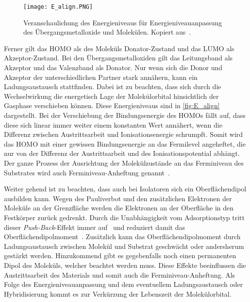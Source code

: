             \begin{figure}
                \centering
                \texttt{[image: E\_align.PNG]}
                \caption{Veranschaulichung des Energieniveaus für Energieniveauanpassung des Übergangsmetalloxide und Molekülen. Kopiert aus~\cite{IF_3}.}
                \label{fig:E_align}
            \end{figure}
            Ferner gilt das HOMO als des Moleküls Donator-Zustand und das LUMO als Akzeptor-Zustand.
            Bei den Übergangsmetalloxiden gilt das Leitungsband als Akzeptor und das Valenzband als Donator. 
            Nur wenn sich die Donor und Akzeptor der unterschiedlichen Partner stark annähern, kann ein Ladungsaustausch stattfinden.
            Dabei ist zu beachten, dass sich durch die Wechselwirkung die energetisch Lage der Molekülorbital hinsichtlich der Gasphase verschieben können.
            Diese Energieniveaus sind in \autoref{fig:E_align} dargestellt.
            Bei der Verschiebung der Bindungsenergie des HOMOs fällt auf, dass diese sich linear immer weiter einem konstanten Wert annähert, wenn die Differenz zwischen Austrittsarbeit und Ionisationsenergie schrumpft.
            Somit wird das HOMO mit einer gewissen Bindungsenergie an das Fermilevel angeheftet, die nur von der Differenz der Austrittsarbeit und des Ionisationspotential abhängt.
            Der ganze Prozess der Ausrichtung der Molekülzustände an das Ferminiveau des Substrates wird auch Ferminiveau-Anheftung genannt~\cite{IF_3}.

            Weiter gehend ist zu beachten, dass auch bei Isolatoren sich ein Oberflächendipol ausbilden kann.
            Wegen des Pauliverbot und den zusätzlichen Elektronen der Moleküle an der Grenzfläche werden die Elektronen an der Oberfläche in den Festkörper zurück gedrenkt.
            Durch die Unabhängigkeit vom Adsorptionstyp tritt dieser \textit{Push-Back}-Effekt immer auf~\cite{IF_4} und reduziert damit das Oberflächendipolmoment~\cite{IF_1}.
            Zusätzlich kann das Oberflächendipolmoment durch Ladungsaustausch zwischen Molekül und Substrat geschwächt oder andersherum gestärkt werden.
            Hinzukommend gibt es gegebenfalls noch einen permanenten Dipol des Moleküls, welcher beachtet werden muss.
            Diese Effekte beeinflussen die Austrittsarbeit des Materials und somit auch die Ferminiveau-Anheftung.
            Als Folge des Energieniveauanpassung und dem eventuellem Ladungsaustausch oder Hybridisierung kommt es zur Verkürzung der Lebenszeit der Molekülorbital.

